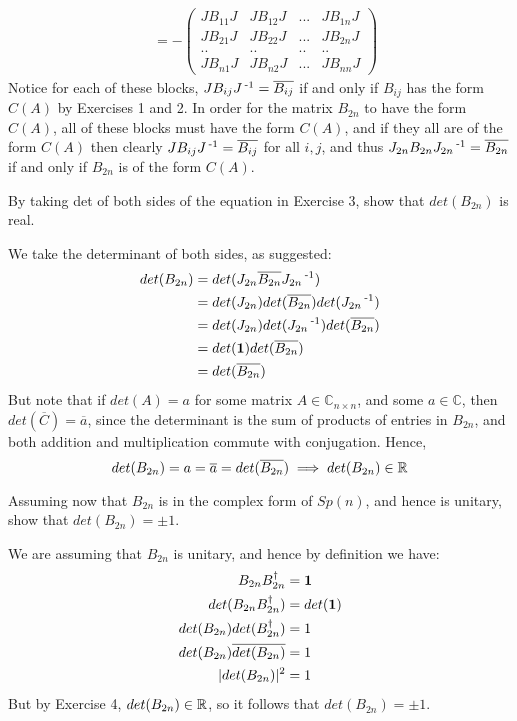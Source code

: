 \documentclass[11pt,onecolumn]{article}
\newcommand{\nn}{_{2n}}
\begin{document}
\begin{answer}
\begin{align*}
    &= - \begin{pmatrix} JB_{11}J & JB_{12}J & ... & JB_{1n}J \\ JB_{21}J & JB_{22}J & ... & JB_{2n}J \\ .. & .. & .. & .. \\ JB_{n1}J & JB_{n2}J & ... & JB_{nn}J\end{pmatrix}
\end{align*}
Notice for each of these blocks, $J B_{ij} J\operatorname{^{-1}} = \overline{B_{ij}}$ if and only if $B_{ij}$ has the form $C(A)$ by Exercises 1 and 2. In order for the matrix $B\nn$ to have the form $C(A)$, all of these blocks must have the form $C(A)$, and if they all are of the form $C(A)$ then clearly $JB_{ij}J\operatorname{^{-1}} = \overline{B_{ij}}$ for all $i,j$, and thus $J\nn B\nn J\nn\inv = \overline{B\nn}$ if and only if $B\nn$ is of the form $C(A)$.
\end{answer}



\begin{exercise}
By taking det of both sides of the equation in Exercise 3, show that $det(B\nn)$ is real. 

\end{exercise}
\begin{answer}
We take the determinant of both sides, as suggested:
\begin{align*}
    det(B\nn) &= det(J\nn \overline{B\nn} J\nn\inv) \\
    &= det(J\nn) det(\overline{B\nn}) det(J\nn\inv) \\
    &= det(J\nn)det(J\nn\inv) det(\overline{B\nn}) \\
    &= det(\one)det(\overline{B\nn}) \\
    &= det(\overline{B\nn})
\end{align*}
But note that if $det(A) = a$ for some matrix $A \in \mathbb{C}_{n \times n}$, and some $a \in \mathbb{C}$, then $det(\overline{C}) = \overline{a}$, since the determinant is the sum of products of entries in $B\nn$, and both addition and multiplication commute with conjugation. Hence, 
$$ det(B\nn) = a = \overline{a} = det(\overline{B\nn}) \implies det(B\nn) \in \real $$
\end{answer}


\begin{exercise}
Assuming now that $B\nn$ is in the complex form of $Sp(n)$, and hence is unitary, show that $det(B\nn)=\pm1$.

\end{exercise}
\begin{answer}
We are assuming that $B\nn$ is unitary, and hence by definition we have:
\begin{align*}
    B\nn B\nn^\dagger &= \one \\
    det(B\nn B\nn^\dagger) &= det(\one) \\
    det(B\nn) det(B\nn^\dagger) &= 1 \\
    det(B\nn)\overline{det(B\nn)} &= 1\\
    |det(B\nn)|^2 &= 1
\end{align*}
But by Exercise 4, $det(B\nn) \in \real$, so it follows that $det(B\nn)=\pm 1$.

\end{answer}
\end{document}
